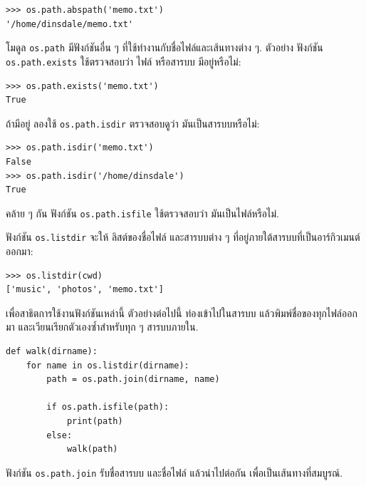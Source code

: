 \begin{verbatim}
>>> os.path.abspath('memo.txt')
'/home/dinsdale/memo.txt'
\end{verbatim}
%
%
โมดูล \texttt{os.path} มีฟังก์ชันอื่น ๆ
ที่ใช้ทำงานกับชื่อไฟล์และเส้นทางต่าง ๆ.
ตัวอย่าง ฟังก์ชัน \texttt{os.path.exists} ใช้ตรวจสอบว่า
ไฟล์ หรือสารบบ มีอยู่หรือไม่:

\begin{verbatim}
>>> os.path.exists('memo.txt')
True
\end{verbatim}
%
%
ถ้ามีอยู่ ลองใช้ \texttt{os.path.isdir} ตรวจสอบดูว่า มันเป็นสารบบหรือไม่:

\begin{verbatim}
>>> os.path.isdir('memo.txt')
False
>>> os.path.isdir('/home/dinsdale')
True
\end{verbatim}
%
%
คล้าย ๆ กัน ฟังก์ชัน \texttt{os.path.isfile}
ใช้ตรวจสอบว่า มันเป็นไฟล์หรือไม่.


ฟังก์ชัน \texttt{os.listdir} จะให้ ลิสต์ของชื่อไฟล์ และสารบบต่าง ๆ
ที่อยู่ภายใต้สารบบที่เป็นอาร์กิวเมนต์ ออกมา:

\begin{verbatim}
>>> os.listdir(cwd)
['music', 'photos', 'memo.txt']
\end{verbatim}
%
%
เพื่อสาธิตการใช้งานฟังก์ชันเหล่านี้
ตัวอย่างต่อไปนี้ ท่องเข้าไปในสารบบ แล้วพิมพ์ชื่อของทุกไฟล์ออกมา
และเวียนเรียกตัวเองซ้ำสำหรับทุก ๆ สารบบภายใน.


\begin{verbatim}
def walk(dirname):
    for name in os.listdir(dirname):
        path = os.path.join(dirname, name)

        if os.path.isfile(path):
            print(path)
        else:
            walk(path)
\end{verbatim}
%
%
ฟังก์ชัน \texttt{os.path.join} รับชื่อสารบบ และชื่อไฟล์
แล้วนำไปต่อกัน เพื่อเป็นเส้นทางที่สมบูรณ์.

